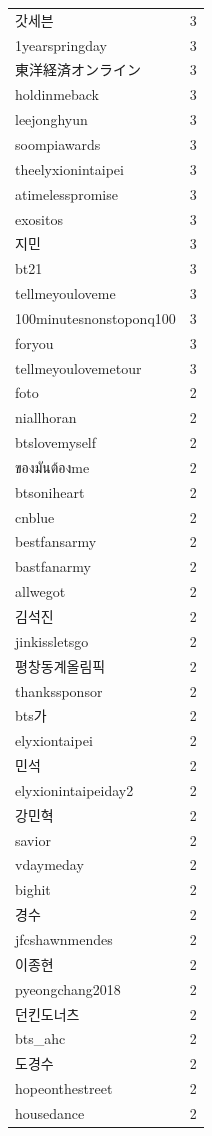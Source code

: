 \begin{tabular}{lr}
갓세븐 & 3 \\
1yearspringday & 3 \\
東洋経済オンライン & 3 \\
holdinmeback & 3 \\
leejonghyun & 3 \\
soompiawards & 3 \\
theelyxionintaipei & 3 \\
atimelesspromise & 3 \\
exositos & 3 \\
지민 & 3 \\
bt21 & 3 \\
tellmeyouloveme & 3 \\
100minutesnonstoponq100 & 3 \\
foryou & 3 \\
tellmeyoulovemetour & 3 \\
foto & 2 \\
niallhoran & 2 \\
btslovemyself & 2 \\
ของมันต้องme & 2 \\
btsoniheart & 2 \\
cnblue & 2 \\
bestfansarmy & 2 \\
bastfanarmy & 2 \\
allwegot & 2 \\
김석진 & 2 \\
jinkissletsgo & 2 \\
평창동계올림픽 & 2 \\
thankssponsor & 2 \\
bts가 & 2 \\
elyxiontaipei & 2 \\
민석 & 2 \\
elyxionintaipeiday2 & 2 \\
강민혁 & 2 \\
savior & 2 \\
vdaymeday & 2 \\
bighit & 2 \\
경수 & 2 \\
jfcshawnmendes & 2 \\
이종현 & 2 \\
pyeongchang2018 & 2 \\
던킨도너츠 & 2 \\
bts\_ahc & 2 \\
도경수 & 2 \\
hopeonthestreet & 2 \\
housedance & 2 \\

\end{tabular}

